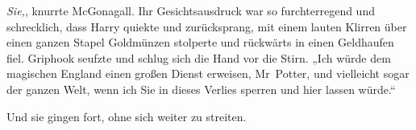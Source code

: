\emph{Sie,}, knurrte McGonagall. Ihr Gesichtsausdruck war so furchterregend und schrecklich, dass Harry quiekte und zurücksprang, mit einem lauten Klirren über einen ganzen Stapel Goldmünzen stolperte und rückwärts in einen Geldhaufen fiel. Griphook seufzte und schlug sich die Hand vor die Stirn. „Ich würde dem magischen England einen großen Dienst erweisen, Mr~Potter, und vielleicht sogar der ganzen Welt, wenn ich Sie in dieses Verlies sperren und hier lassen würde.“

Und sie gingen fort, ohne sich weiter zu streiten.

